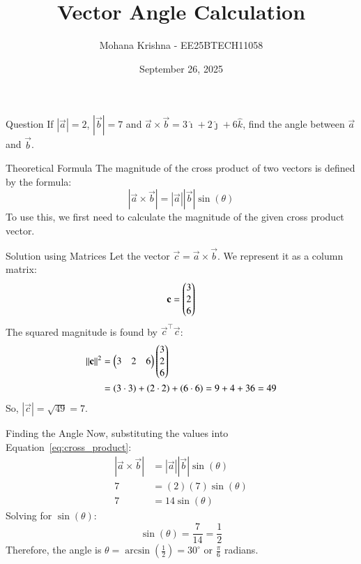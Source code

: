 \documentclass{beamer}
\begin{document}
\title
{Vector Angle Calculation}
\date{September 26, 2025}

\author
{Mohana Krishna - EE25BTECH11058}

\frame{\titlepage}

\begin{frame}{Question}
If $|\vec{a}| = 2$, $|\vec{b}| = 7$ and $\vec{a} \times \vec{b} = 3\hat{\imath} + 2\hat{\jmath} + 6\hat{k}$, find the angle between $\vec{a}$ and $\vec{b}$.
\end{frame}

\begin{frame}{Theoretical Formula}
The magnitude of the cross product of two vectors is defined by the formula:
\begin{equation}
|\vec{a} \times \vec{b}| = |\vec{a}| |\vec{b}| \sin(\theta)
\label{eq:cross_product}
\end{equation}
To use this, we first need to calculate the magnitude of the given cross product vector.
\end{frame}

\begin{frame}{Solution using Matrices}
Let the vector $\vec{c} = \vec{a} \times \vec{b}$. We represent it as a column matrix:
\begin{equation}
\mathbf{c} = \begin{pmatrix}3 \\ 2 \\ 6\end{pmatrix}
\end{equation}
The squared magnitude is found by $\vec{c}^\top\vec{c}$:
\begin{align*}
\left\lVert\mathbf{c}\right\rVert^2 &= \begin{pmatrix}3 & 2 & 6\end{pmatrix} \begin{pmatrix}3 \\ 2 \\ 6\end{pmatrix} \\
&= (3 \cdot 3) + (2 \cdot 2) + (6 \cdot 6) = 9 + 4 + 36 = 49
\end{align*}
So, $|\vec{c}| = \sqrt{49} = 7$.
\end{frame}

\begin{frame}{Finding the Angle}
Now, substituting the values into Equation~\eqref{eq:cross_product}:
\begin{align*}
|\vec{a} \times \vec{b}| &= |\vec{a}| |\vec{b}| \sin(\theta) \\
7 &= (2)(7) \sin(\theta) \\
7 &= 14 \sin(\theta)
\end{align*}
Solving for $\sin(\theta)$:
\begin{equation*}
\sin(\theta) = \frac{7}{14} = \frac{1}{2}
\end{equation*}
Therefore, the angle is $\theta = \arcsin\left(\frac{1}{2}\right) = 30^\circ$ or $\frac{\pi}{6}$ radians.
\end{frame}
\end{document}
